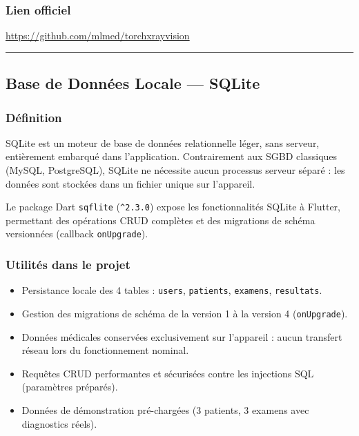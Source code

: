 \documentclass[12pt,a4paper]{report}
\begin{document}
\subsubsection*{Lien officiel}
\url{https://github.com/mlmed/torchxrayvision}

\medskip\hrule\medskip

\subsection{Base de Données Locale --- SQLite}

\noindent\begin{minipage}[t]{0.66\textwidth}
\subsubsection*{Définition}
SQLite est un moteur de base de données relationnelle léger, sans serveur, entièrement embarqué dans l'application. Contrairement aux SGBD classiques (MySQL, PostgreSQL), SQLite ne nécessite aucun processus serveur séparé : les données sont stockées dans un fichier unique sur l'appareil.

Le package Dart \texttt{sqflite} (\texttt{\^{}2.3.0}) expose les fonctionnalités SQLite à Flutter, permettant des opérations CRUD complètes et des migrations de schéma versionnées (callback \texttt{onUpgrade}).
\end{minipage}\hfill
\begin{minipage}[t]{0.30\textwidth}
\vspace{0pt}
\begin{center}
\end{center}
\end{minipage}

\subsubsection*{Utilités dans le projet}
\begin{itemize}
  \item Persistance locale des 4 tables : \texttt{users}, \texttt{patients}, \texttt{examens}, \texttt{resultats}.
  \item Gestion des migrations de schéma de la version 1 à la version 4 (\texttt{onUpgrade}).
  \item Données médicales conservées exclusivement sur l'appareil : aucun transfert réseau lors du fonctionnement nominal.
  \item Requêtes CRUD performantes et sécurisées contre les injections SQL (paramètres préparés).
  \item Données de démonstration pré-chargées (3 patients, 3 examens avec diagnostics réels).
\end{itemize}
\end{document}
